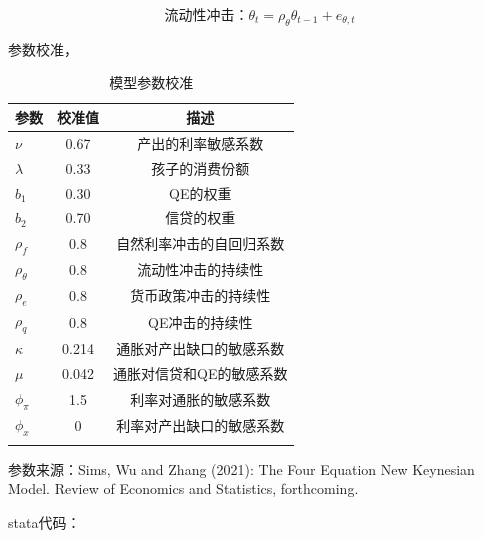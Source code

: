 \documentclass[cn,12pt,math=newtx,citestyle=gb7714-2015,bibstyle=gb7714-2015]{elegantbook}
\begin{document}
	\begin{equation}
		\text{流动性冲击：}\theta_t =\rho_\theta \theta_{t-1} + e_{\theta,t}
	\end{equation}
	
	参数校准，
	
	\begin{table}[htbp]\centering
		\scriptsize
		\caption{模型参数校准}
		\label{param}
		\begin{center}
			\begin{threeparttable}
				\begin{tabular}{l*{2}{c}}
					\toprule
					\multicolumn{1}{l}{\textbf{参数}}&
					\multicolumn{1}{c}{\textbf{校准值}}&
					\multicolumn{1}{c}{描述} \\
					\midrule
					$\nu$ &0.67&产出的利率敏感系数\\
					$\lambda$              &      0.33  &孩子的消费份额     \\
					$b_1$ &   0.30   &    QE的权重   \\
					$b_2$        &     0.70 &信贷的权重      \\
					$\rho_f$ & 0.8 & 自然利率冲击的自回归系数  \\
					$\rho_\theta$ & 0.8 & 流动性冲击的持续性  \\
					$\rho_e$ & 0.8 & 货币政策冲击的持续性  \\
					$\rho_q$ & 0.8 & QE冲击的持续性  \\
					$\kappa$ & 0.214 & 通胀对产出缺口的敏感系数  \\
					$\mu$ & 0.042& 通胀对信贷和QE的敏感系数  \\
					$\phi_\pi$ & 1.5 & 利率对通胀的敏感系数  \\
					$\phi_x$ & 0 & 利率对产出缺口的敏感系数  \\
					
					\\
					\bottomrule
				\end{tabular}
				\begin{tablenotes}
					\tiny
					\item 参数来源：Sims, Wu and Zhang (2021): The Four Equation New Keynesian Model. Review of Economics and Statistics, forthcoming.
				\end{tablenotes}
			\end{threeparttable}
		\end{center}
	\end{table}
	
	stata代码：
	
\end{document}
